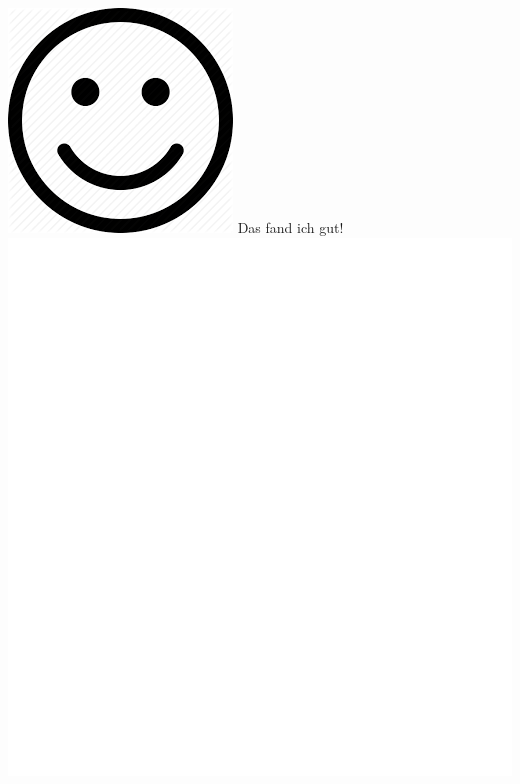 \documentclass[oneside,openany,headings=optiontotoc,11pt,numbers=noenddot]{scrreprt}
\begin{document}
	\begin{framed}
		\noindent
		\includegraphics[scale=0.1]{hsmi.png} \tiny{\color{codegray}Das fand ich gut!}\\
		\includegraphics[scale=0.15]{empty.jpg}
	\end{framed}
\end{document}
